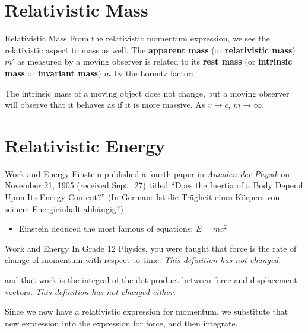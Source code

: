 \documentclass[12pt,compress,aspectratio=169]{beamer}
\newcommand{\mb}[1]{\mathbf{#1}}
\newcommand{\bigsqrt}{\ensuremath\sqrt{1-\left(\frac{v}{c}\right)^2}}
\newcommand{\eq}[2]{\vspace{#1}{\Large\begin{displaymath}#2\end{displaymath}}}
\begin{document}
\section[RE.\ Mass]{Relativistic Mass}

\begin{frame}{Relativistic Mass}
  From the relativistic momentum expression, we see the relativistic aspect to
  mass as well. The \textbf{apparent mass} (or \textbf{relativistic mass}) $m'$
  as measured by a moving observer is related to its \textbf{rest mass} (or
  \textbf{intrinsic mass} or \textbf{invariant mass}) $m$ by the Lorentz factor:

  \eq{-.18in}{
    \boxed{m'=\frac{m}{\bigsqrt}=\gamma m}
  }
  
  The intrinsic mass of a moving object does not change, but a moving observer
  will observe that it behaves as if it is more massive. As $v\rightarrow c$,
  $m\rightarrow\infty$.
\end{frame}



\section[Energy]{Relativistic Energy}

\begin{frame}{Work and Energy}
  Einstein published a fourth paper in \emph{Annalen der Physik} on November
  21, 1905 (received Sept.\ 27) titled ``Does the Inertia of a Body Depend Upon
  Its Energy Content?'' (In German: Ist die Tr\"{a}gheit eines K\"{o}rpers von
  seinem Energieinhalt abh\"{a}ngig?)
  \begin{itemize}
  \item Einstein deduced the most famous of equations: $E=mc^2$
  \end{itemize}
\end{frame}


\begin{frame}{Work and Energy}
  In Grade 12 Physics, you were taught that force is the rate of change of
  momentum with respect to time. \emph{This definition has not changed.}

  \eq{-.2in}{
    \mb{F}=\frac{d\mb{p}}{dt}
  }

  \vspace{-.1in}and that work is the integral of the dot product between force
  and displacement vectors. \emph{This definition has not changed either.}

  \eq{-.2in}{
    W=\int\mb{F}\cdot d\mb{x}=\int\frac{d\mb{p}}{dt}\cdot \mb{dx}
  }

  \vspace{-.1in}Since we now have a relativistic expression for momentum, we
  substitute that new expression into the expression for force, and then
  integrate.
\end{frame}
\end{document}
